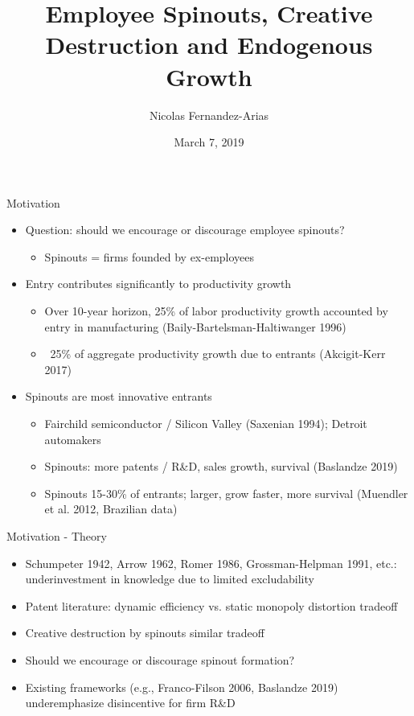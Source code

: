 \documentclass[english,usenames,dvipsnames]{beamer}
\title{Employee Spinouts, Creative Destruction and Endogenous Growth}
\author{Nicolas Fernandez-Arias}
\institute{Student Macro Workshop}
\date{March 7, 2019}
\begin{document}
\maketitle



\begin{frame}{Motivation}
\begin{itemize}
	\item Question: should we encourage or discourage employee spinouts? 
	\begin{itemize}
		\item Spinouts = firms founded by ex-employees
	\end{itemize}
	\item Entry contributes significantly to productivity growth
	\begin{itemize}
		\item Over 10-year horizon, 25\% of labor productivity growth accounted by entry in manufacturing (Baily-Bartelsman-Haltiwanger 1996)
		\item ~25\% of aggregate productivity growth due to entrants (Akcigit-Kerr 2017)
	\end{itemize}
	\item Spinouts are most innovative entrants
	\begin{itemize}
		\item Fairchild semiconductor / Silicon Valley (Saxenian 1994); Detroit automakers
		\item Spinouts: more patents / R\&D, sales growth, survival (Baslandze 2019) 
		\item Spinouts 15-30\% of entrants; larger, grow faster, more survival (Muendler et al. 2012, Brazilian data)
	\end{itemize}
\end{itemize}
\end{frame}



\begin{frame}{Motivation - Theory}
\label{theory_big_picture}
\begin{itemize}
	\item Schumpeter 1942, Arrow 1962, Romer 1986, Grossman-Helpman 1991, etc.: \alert{underinvestment} in knowledge due to \alert{limited excludability}
	\item Patent literature: dynamic efficiency vs. static monopoly distortion tradeoff
	\item Creative destruction by spinouts similar tradeoff
	\item Should we encourage or discourage spinout formation?
	\item Existing frameworks (e.g., Franco-Filson 2006, Baslandze 2019) underemphasize disincentive for firm R\&D 
\end{itemize}
\end{frame}
\end{document}
